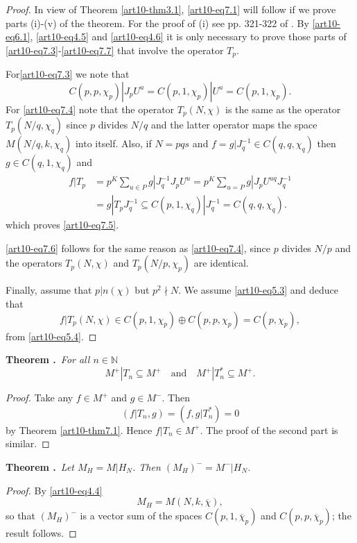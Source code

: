 \begin{proof}
In view of Theorem \ref{art10-thm3.1}, \eqref{art10-eq7.1} will follow if we prove parts (i)-(v) of the theorem. For the proof of (i) see pp. 321-322 of \cite{art10-key9}. By \eqref{art10-eq6.1}, \eqref{art10-eq4.5} and \eqref{art10-eq4.6} it is only necessary to prove those parts of \eqref{art10-eq7.3}-\eqref{art10-eq7.7} that involve the operator $T_{p}$.

For\pageoriginale \eqref{art10-eq7.3} we note that
$$
C(p,p,\chi_{p})|J_{p}U^{u}=C(p,1,\chi_{p})|U^{u}=C(p,1,\chi_{p}).
$$
For \eqref{art10-eq7.4} note that the operator $T_{p}(N,\chi)$ is the same as the operator $T_{p}(N/q,\chi_{q})$ since $p$ divides $N/q$ and the latter operator maps the space $M(N/q,k,\chi_{q})$ into itself. Also, if $N=pqs$ and $f=g|J^{-1}_{q}\in C(q,q,\chi_{q})$ then $g\in C(q,1,\chi_{q})$ and 
\begin{align*}
f|T_{p} &= p^{K}\sum\limits_{u\in P}g|J^{-1}_{q}J_{p}U^{u}=p^{K}\sum\limits_{u=P}g|J_{p}U^{uq}J^{-1}_{q}\\[3pt]
&= g|T_{p}J^{-1}_{q}\subseteq C(p,1,\chi_{q})|J^{-1}_{q}=C(q,q,\chi_{q}).
\end{align*}
which proves \eqref{art10-eq7.5}.

\eqref{art10-eq7.6} follows for the same reason as \eqref{art10-eq7.4}, since $p$ divides $N/p$ and the operators $T_{p}(N,\chi)$ and $T_{p}(N/p,\chi_{p})$ are identical.

Finally, assume that $p|n(\chi)$ but $p^{2}\nmid N$. We assume \eqref{art10-eq5.3} and deduce that
$$
f|T_{p}(N,\chi)\in C(p,1,\chi_{p})\oplus C(p,p,\chi_{p})=C(p,\chi_{p}),
$$
from \eqref{art10-eq5.4}.
\end{proof}

\medskip
\noindent
{\bf Theorem .\label{art10-thm7.2}}~{\em For all $n\in \mathbb{N}$}
$$
M^{+}|T_{n}\subseteq M^{+}\text{~~ and~~ } M^{+}|T^{*}_{n}\subseteq M^{+}.
$$

\begin{proof}
Take any $f\in M^{+}$ and $g\in M^{-}$. Then
$$
(f|T_{n},g)=(f,g|T^{*}_{n})=0
$$
by Theorem \ref{art10-thm7.1}. Hence $f|T_{n}\in M^{+}$. The proof of the second part is similar.
\end{proof}

\medskip
\noindent
{\bf Theorem .\label{art10-thm7.3}}~{\em Let $M_{H}=M|H_{N}$. Then $(M_{H})^{-}=M^{-}|H_{N}$.}

\begin{proof}
By \eqref{art10-eq4.4}
$$
M_{H}=M(N,k,\overline{\chi}),
$$
so that $(M_{H})^{-}$ is a vector sum of the spaces $C(p,1,\overline{\chi}_{p})$ and $C(p,p,\overline{\chi}_{p})$; the result follows.
\end{proof}

